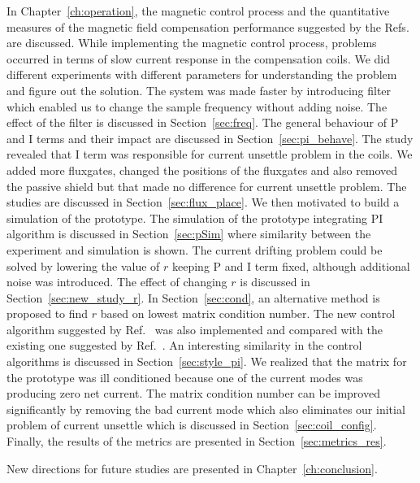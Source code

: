 In Chapter~\ref{ch:operation}, the magnetic control process and the
quantitative measures of the magnetic field compensation performance
suggested by the Refs.~\cite{bea,lins,rawlik} are discussed. While implementing the magnetic control process, problems occurred in terms of slow
current response in the compensation coils. We did different
experiments with different parameters for understanding the problem
and figure out the solution. The system was made faster by introducing
filter which enabled us to change the sample frequency without adding
noise. The effect of the filter is discussed in
Section~\ref{sec:freq}. The general behaviour
of P and I terms and their impact are
discussed in Section~\ref{sec:pi_behave}. The study
revealed that I term was responsible for current unsettle problem in the
coils. We added more fluxgates, changed the positions
of the fluxgates and also removed the passive shield but that made no difference for current unsettle problem. The studies are discussed in Section~\ref{sec:flux_place}. We then motivated to build a
simulation of the prototype. The simulation of the prototype
integrating PI algorithm is discussed in Section~\ref{sec:pSim} where
similarity between the experiment and simulation is shown. The current drifting problem could be solved by lowering the value of $r$ keeping P
and I term fixed, although additional noise was introduced. The effect of changing $r$ is discussed in Section~\ref{sec:new_study_r}. In Section~\ref{sec:cond}, an alternative method is proposed to find $r$ based on lowest matrix condition number. The new control algorithm suggested by Ref.~\cite{rawlik} was also implemented and compared with the existing one suggested by Ref.~\cite{bea}. An interesting similarity in the control algorithms is discussed in Section~\ref{sec:style_pi}. We realized that the matrix for the prototype was ill conditioned because one of the current modes was producing zero net current. The matrix condition number can be improved significantly by removing the bad current mode which also eliminates our initial problem of current unsettle which is discussed in Section~\ref{sec:coil_config}. Finally, the results of the metrics are presented in Section~\ref{sec:metrics_res}. 

New directions for future studies are presented in
Chapter~\ref{ch:conclusion}.

